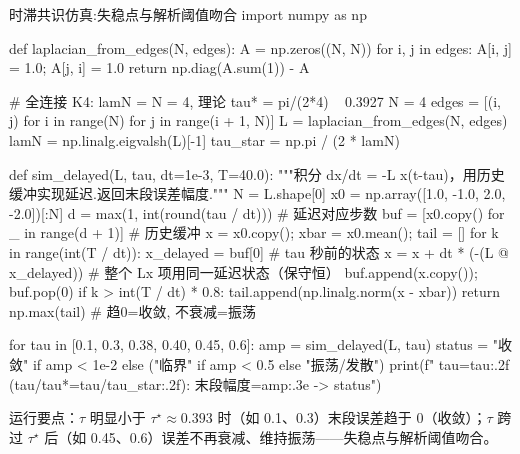 \begin{codebox}[Python]{时滞共识仿真:失稳点与解析阈值吻合}
import numpy as np

def laplacian_from_edges(N, edges):
    A = np.zeros((N, N))
    for i, j in edges:
        A[i, j] = 1.0; A[j, i] = 1.0
    return np.diag(A.sum(1)) - A

# 全连接 K4: lamN = N = 4, 理论 tau* = pi/(2*4) ~ 0.3927
N = 4
edges = [(i, j) for i in range(N) for j in range(i + 1, N)]
L = laplacian_from_edges(N, edges)
lamN = np.linalg.eigvalsh(L)[-1]
tau_star = np.pi / (2 * lamN)

def sim_delayed(L, tau, dt=1e-3, T=40.0):
    """积分 dx/dt = -L x(t-tau)，用历史缓冲实现延迟.返回末段误差幅度."""
    N = L.shape[0]
    x0 = np.array([1.0, -1.0, 2.0, -2.0])[:N]
    d = max(1, int(round(tau / dt)))         # 延迟对应步数
    buf = [x0.copy() for _ in range(d + 1)]   # 历史缓冲
    x = x0.copy(); xbar = x0.mean(); tail = []
    for k in range(int(T / dt)):
        x_delayed = buf[0]                    # tau 秒前的状态
        x = x + dt * (-(L @ x_delayed))       # 整个 Lx 项用同一延迟状态（保守恒）
        buf.append(x.copy()); buf.pop(0)
        if k > int(T / dt) * 0.8:
            tail.append(np.linalg.norm(x - xbar))
    return np.max(tail)                       # 趋0=收敛, 不衰减=振荡

for tau in [0.1, 0.3, 0.38, 0.40, 0.45, 0.6]:
    amp = sim_delayed(L, tau)
    status = "收敛" if amp < 1e-2 else ("临界" if amp < 0.5 else "振荡/发散")
    print(f"  tau={tau:.2f} (tau/tau*={tau/tau_star:.2f}): 末段幅度={amp:.3e} -> {status}")
\end{codebox}

\noindent 运行要点：$\tau$ 明显小于 $\tau^\star\approx0.393$ 时（如 0.1、0.3）末段误差趋于 0（收敛）；$\tau$ 跨过 $\tau^\star$ 后（如 0.45、0.6）误差不再衰减、维持振荡——失稳点与解析阈值吻合。


